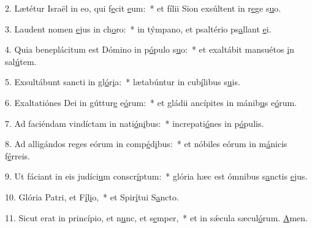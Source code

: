 2. Lætétur Israël in eo, qui f\uline{e}cit \uline{e}um:~* et fílii Sion exsúltent in r\uline{e}ge s\uline{u}o.\par 
3. Laudent nomen \uline{e}jus in ch\uline{o}ro:~* in týmpano, et psaltério ps\uline{a}llant \uline{e}i.\par 
4. Quia beneplácitum est Dómino in p\uline{ó}pulo s\uline{u}o:~* et exaltábit mansuétos \uline{i}n sal\uline{ú}tem.\par 
5. Exsultábunt sancti in gl\uline{ó}r\uline{i}a:~* lætabúntur in cub\uline{í}libus s\uline{u}is.\par 
6. Exaltatiónes Dei in gúttur\uline{e} e\uline{ó}rum:~* et gládii ancípites in mánib\uline{u}s e\uline{ó}rum.\par 
7. Ad faciéndam vindíctam in nati\uline{ó}n\uline{i}bus:~* increpati\uline{ó}nes in p\uline{ó}pulis.\par 
8. Ad alligándos reges eórum in comp\uline{é}d\uline{i}bus:~* et nóbiles eórum in m\uline{á}nicis f\uline{é}rreis.\par 
9. Ut fáciant in eis judíci\uline{u}m conscr\uline{í}ptum:~* glória hæc est ómnibus s\uline{a}nctis \uline{e}jus.\par 
10. Glória Patri, et F\uline{í}l\uline{i}o,~* et Spir\uline{í}tui S\uline{a}ncto.\par 
11. Sicut erat in princípio, et n\uline{u}nc, et s\uline{e}mper,~* et in sǽcula sæcul\uline{ó}rum. \uline{A}men.\par 
